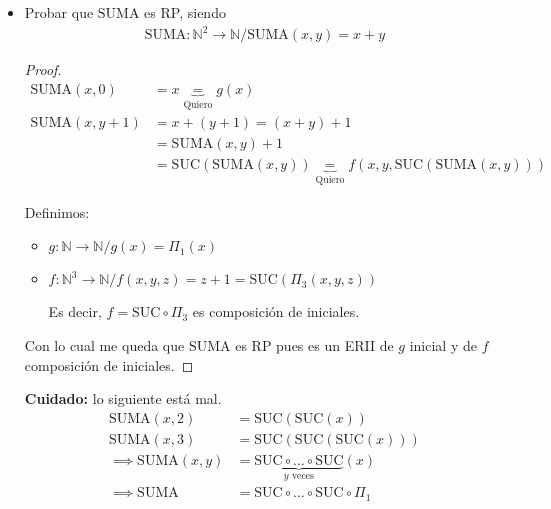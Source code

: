 \begin{itemize}
    \item Probar que $\mathrm{SUMA}$ es RP, siendo
    \begin{gather*}
        \mathrm{SUMA}: \mathbb{N}^2 \to \mathbb{N} / \mathrm{SUMA}(x,y) = x+y
    \end{gather*}
    
    \begin{proof} \phantom{.}
    
        \begin{align*}
            \mathrm{SUMA}(x,0) &= x \underbrace{=}_{\text{Quiero}} g(x) \\
            \mathrm{SUMA} (x,y+1) &= x + (y+1) = (x+y) + 1 \\ 
            &= \mathrm{SUMA}(x,y)+1 \\
            &= \mathrm{SUC}(\mathrm{SUMA}(x,y))
            \underbrace{=}_{\text{Quiero}} 
            f(x,y,\mathrm{SUC}(\mathrm{SUMA}(x,y)))
        \end{align*}
    
        Definimos:
        \begin{itemize}
            \item $g: \mathbb{N} \to \mathbb{N} / g(x) = \Pi_1 (x)$
    
            \item $f: \mathbb{N}^3 \to \mathbb{N} / 
                f(x,y,z) = z+1 = \mathrm{SUC}(\Pi_3 (x,y,z))$
    
            Es decir, 
            $f = \mathrm{SUC} \circ \Pi_3$ 
            es composición de iniciales.
        \end{itemize}
    
        Con lo cual me queda que $\mathrm{SUMA}$ es RP pues es un ERII de $g$
        inicial y de $f$ composición de iniciales.
    
    \end{proof}
    
    \textbf{Cuidado:} lo siguiente está mal.
    \begin{align*}
        \mathrm{SUMA}(x,2) &= \mathrm{SUC}( \mathrm{SUC} (x)) \\
        \mathrm{SUMA}(x,3) &= \mathrm{SUC}( \mathrm{SUC}( \mathrm{SUC} (x))) \\
        \implies \mathrm{SUMA}(x,y) &= \underbrace{\mathrm{SUC} \circ \dotsc 
        \circ \mathrm{SUC}}_{y \text{ veces}}(x) \\
        \implies \mathrm{SUMA} &= \mathrm{SUC} \circ \dotsc \circ \mathrm{SUC} 
        \circ \Pi_1
    \end{align*}
    

\end{itemize}
